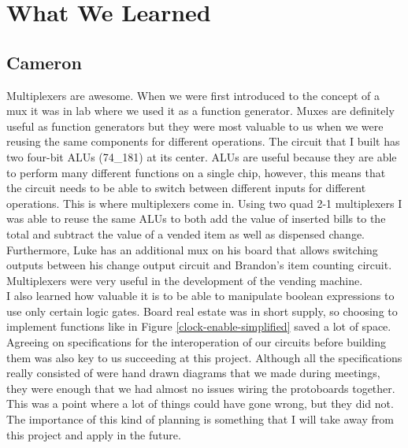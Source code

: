 \section{What We Learned} 

\subsection{Cameron}
Multiplexers are awesome. When we were first introduced to the concept of a mux it was in lab where we used it as a function generator. Muxes are definitely useful as function generators but they were most valuable to us when we were reusing the same components for different operations. The circuit that I built has two four-bit ALUs (74\_181) at its center. ALUs are useful because they are able to perform many different functions on a single chip, however, this means that the circuit needs to be able to switch between different inputs for different operations. This is where multiplexers come in. Using two quad 2-1 multiplexers I was able to reuse the same ALUs to both add the value of inserted bills to the total and subtract the value of a vended item as well as dispensed change. Furthermore, Luke has an additional mux on his board that allows switching outputs between his change output circuit and Brandon's item counting circuit. Multiplexers were very useful in the development of the vending machine. \\

I also learned how valuable it is to be able to manipulate boolean expressions to use only certain logic gates. Board real estate was in short supply, so choosing to implement functions like in Figure \ref{clock-enable-simplified} saved a lot of space. \\

Agreeing on specifications for the interoperation of our circuits before building them was also key to us succeeding at this project. Although all the specifications really consisted of were hand drawn diagrams that we made during meetings, they were enough that we had almost no issues wiring the protoboards together. This was a point where a lot of things could have gone wrong, but they did not. The importance of this kind of planning is something that I will take away from this project and apply in the future. 

